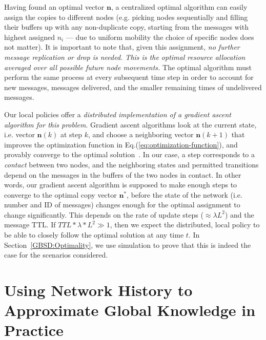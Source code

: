 Having found an optimal vector $\mathbf{n}$, a centralized optimal algorithm can easily assign the copies to different nodes (e.g. picking nodes sequentially and filling their buffers up with any non-duplicate copy, starting from the messages with highest assigned $n_{i}$ --- due to uniform mobility the choice of specific nodes does not matter). It is important to note that, given this assignment, \emph{no further message replication or drop is needed. This is the optimal resource allocation averaged over all possible future node movements.} The optimal algorithm must perform the same process at every subsequent time step in order to account for new messages, messages delivered, and the smaller remaining times of undelivered messages.

Our local policies offer a \emph{distributed implementation of a gradient ascent algorithm for this problem}. Gradient ascent algorithms look at the current state, i.e. vector $\mathbf{n}(k)$ at step $k$, and choose a neighboring vector $\mathbf{n}(k+1)$ that improves the optimization function in Eq.(\ref{eq:optimization-function}), and provably converge to the optimal solution~\cite{Boyd:convex-optimization-book}. In our case, a step corresponds to a \emph{contact} between two nodes, and the neighboring states and permitted transitions depend on the messages in the buffers of the two nodes in contact. In other words, our gradient ascent algorithm is supposed to make enough steps to converge to the optimal copy vector $\mathbf{n^{*}}$, before the state of the network (i.e. number and ID of messages) changes enough for the optimal assignment to change significantly. This depends on the rate of update steps ($\approx \lambda L^{2}$) and the message TTL. If $TTL * \lambda * L^{2} \gg 1$, then we expect the distributed, local policy to be able to closely follow the optimal solution at any time $t$. In Section~\ref{GBSD:Optimality}, we use simulation to prove that this is indeed the case for the scenarios considered.

\section{Using Network History to Approximate Global Knowledge in Practice}
\label{sec:learning}

